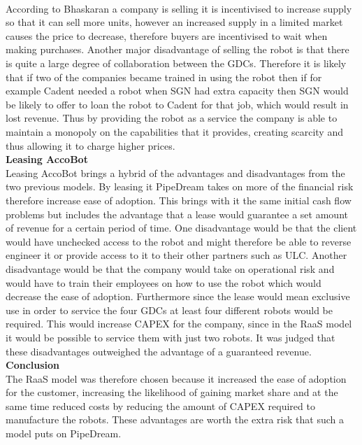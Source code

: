 \documentclass[11pt]{article}		%
\newcommand{\supercite}[1]{\textsuperscript{\cite{#1}}}		%
\begin{document}
             According to Bhaskaran\supercite{leasing_strategy} a company is selling it is incentivised to increase supply so that it can sell more units, however an increased supply in a limited market causes the price to decrease, therefore buyers are incentivised to wait when making purchases.
            Another major disadvantage of selling the robot is that there is quite a large degree of collaboration between the GDCs. Therefore it is likely that if two of the companies became trained in using the robot then if for example Cadent needed a robot when SGN had extra capacity then SGN would be likely to offer to loan the robot to Cadent for that job, which would result in lost revenue.
            Thus by providing the robot as a service the company is able to maintain a monopoly on the capabilities that it provides, creating scarcity and thus allowing it to charge higher prices. 
            \\
            \textbf{Leasing AccoBot}
            \\
            Leasing AccoBot brings a hybrid of the advantages and disadvantages from the two previous models. By leasing it PipeDream takes on more of the financial risk therefore increase ease of adoption. This brings with it the same initial cash flow problems but includes the advantage that a lease would guarantee a set amount of revenue for a certain period of time. One disadvantage would be that the client would have unchecked access to the robot and might therefore be able to reverse engineer it or provide access to it to their other partners such as ULC. Another disadvantage would be that the company would take on operational risk and would have to train their employees on how to use the robot which would decrease the ease of adoption. Furthermore since the lease would mean exclusive use in order to service the four GDCs at least four different robots would be required. This would increase CAPEX for the company, since in the RaaS model it would be possible to service them with just two robots. It was judged that these  disadvantages outweighed the advantage of a guaranteed revenue.
            \\
            \textbf{Conclusion}
            \\
            The RaaS model was therefore chosen because it increased the ease of adoption for the customer, increasing the likelihood of gaining market share and at the same time reduced costs by reducing the amount of CAPEX required to manufacture the robots. These advantages are worth the extra risk that such a model puts on PipeDream.
            
\end{document}
